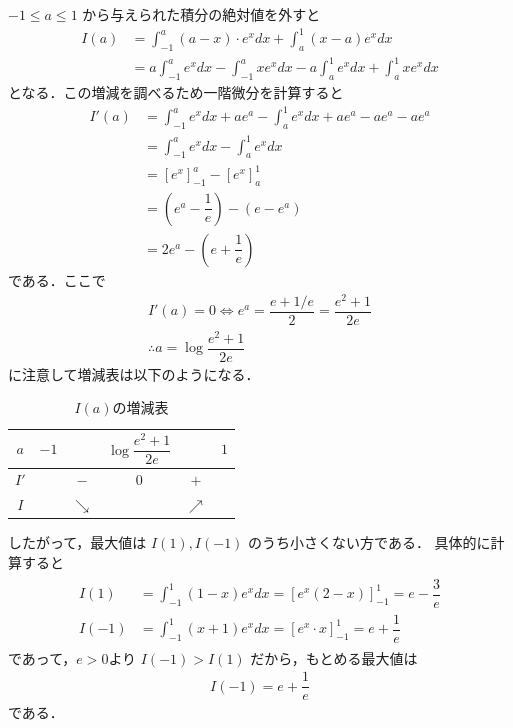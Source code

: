\documentclass[../../main.tex]{subfiles}
\begin{document}
$-1\le a\le1$ から与えられた積分の絶対値を外すと
\begin{align}
  I(a)
  &=\int_{-1}^a(a-x)\cdot e^xdx+\int_a^1(x-a)e^xdx \\
  &=a\int_{-1}^ae^xdx-\int_{-1}^axe^xdx-a\int_a^1e^xdx+\int_a^1xe^xdx
\end{align}
となる．この増減を調べるため一階微分を計算すると
\begin{align}
  I'(a)
  &=\int_{-1}^ae^xdx+ae^a-\int_a^1e^xdx+ae^a-ae^a-ae^a \\
  &= \int_{-1}^ae^xdx-\int_a^1e^xdx \\
  &=\left[e^x\right]_{-1}^a-\left[e^x\right]_a^1 \\
  &=\left(e^a-\dfrac{1}{e}\right)-(e-e^a) \\
  &=2e^a-\left(e+\dfrac{1}{e}\right)
\end{align}
である．ここで
\begin{align}
  I'(a)=0\iff e^a=\dfrac{e+1/e}{2}=\dfrac{e^2+1}{2e} \\
  \therefore
  a=\log\dfrac{e^2+1}{2e}
\end{align}
に注意して増減表は以下のようになる．

\begin{table}[htb]
  \begin{center}
    \caption{$I(a)$の増減表}
    \begin{tabular}{c|c|c|c|c|c}
      $a$ & $-1$ & & $\log\dfrac{e^2+1}{2e}$ & & $1$ \\
      \hline
      $I'$ & & $-$ & $0$ & $+$ & \\
      \hline
      $I$ & & $\searrow$ & & $\nearrow$ &
    \end{tabular}
  \end{center}
\end{table}

したがって，最大値は $I(1), I(-1)$ のうち小さくない方である．
具体的に計算すると
\begin{align}
  \begin{split}
    I(1)&=\int_{-1}^1(1-x)e^xdx=\left[e^x(2-x)\right]_{-1}^1=e-\dfrac{3}{e} \\
    I(-1)&=\int_{-1}^1(x+1)e^xdx=\left[e^x\cdot x\right]_{-1}^1=e+\dfrac{1}{e}
  \end{split}
\end{align}
であって，$e>0$より $I(-1)>I(1)$ だから，もとめる最大値は
\begin{align}
  I(-1)=e+\dfrac{1}{e}
\end{align}
である．
\end{document}
